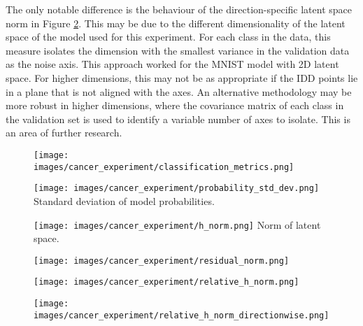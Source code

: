 \documentclass{article}
\begin{document}
The only notable difference is the behaviour of the direction-specific latent space norm in Figure \ref{res:cancer relative h norm directionwise}. This may be due to the different dimensionality of the latent space of the model used for this experiment. For each class in the data, this measure isolates the dimension with the smallest variance in the validation data as the noise axis. This approach worked for the MNIST model with 2D latent space. For higher dimensions, this may not be as appropriate if the IDD points lie in a plane that is not aligned with the axes. An alternative methodology may be more robust in higher dimensions, where the covariance matrix of each class in the validation set is used to identify a variable number of axes to isolate. This is an area of further research.



\begin{figure}[h]
\centering
\begin{minipage}{.25\textwidth}
  \centering
  \texttt{[image: images/cancer\_experiment/classification\_metrics.png]}
  \label{res:cancer accuracy}
\end{minipage}%
\hspace{.05\textwidth}
\begin{minipage}{.25\textwidth}
  \centering
  \texttt{[image: images/cancer\_experiment/probability\_std\_dev.png]}
  {Standard deviation of model probabilities.}
  \label{res:cancer prob std}
\end{minipage}
\begin{minipage}{.25\textwidth}
  \centering
  \texttt{[image: images/cancer\_experiment/h\_norm.png]}
  {Norm of latent space.}
  \label{res:cancer h norm}
\end{minipage}
\end{figure}


\begin{figure}[h]
\centering
\begin{minipage}{.25\textwidth}
  \centering
  \texttt{[image: images/cancer\_experiment/residual\_norm.png]}
  \label{res:cancer r norm}
\end{minipage}%
\hspace{.05\textwidth}
\begin{minipage}{.25\textwidth}
  \centering
  \texttt{[image: images/cancer\_experiment/relative\_h\_norm.png]}
  \label{res:cancer relative h norm}
\end{minipage}
\begin{minipage}{.25\textwidth}
  \centering
  \texttt{[image: images/cancer\_experiment/relative\_h\_norm\_directionwise.png]}
  \label{res:cancer relative h norm directionwise}
\end{minipage}
\end{figure}
\end{document}
